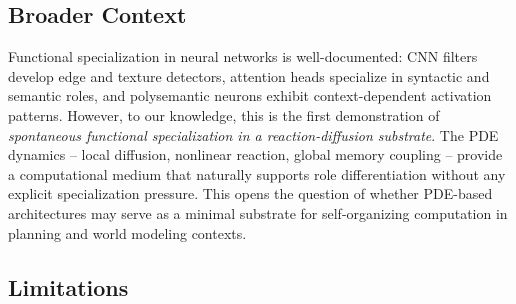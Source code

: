 \documentclass{article}
\begin{document}
\subsection{Broader Context}

Functional specialization in neural networks is well-documented: CNN filters develop edge and texture detectors, attention heads specialize in syntactic and semantic roles, and polysemantic neurons exhibit context-dependent activation patterns. However, to our knowledge, this is the first demonstration of \emph{spontaneous functional specialization in a reaction-diffusion substrate}. The PDE dynamics -- local diffusion, nonlinear reaction, global memory coupling -- provide a computational medium that naturally supports role differentiation without any explicit specialization pressure. This opens the question of whether PDE-based architectures may serve as a minimal substrate for self-organizing computation in planning and world modeling contexts.

\subsection{Limitations}
\end{document}
